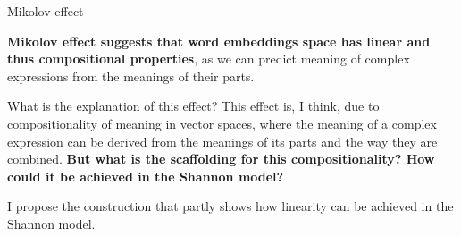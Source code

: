 \documentclass[10pt, aspectratio=169]{beamer}
\begin{document}
\begin{frame}{Mikolov effect}

   
       
   \textbf{ Mikolov effect suggests that word embeddings space has linear and thus compositional properties}, as we can predict meaning of complex expressions from the meanings of their parts.
  

    What is the explanation of this effect?
    This effect is, I think,  due to  compositionality of meaning in vector spaces, where the meaning of a complex expression can be derived from the meanings of its parts and the way they are combined.
\textbf{
    But what is the scaffolding for this compositionality? How could it be achieved in the Shannon model? }
    
    I propose the construction that partly shows how linearity can be achieved in the Shannon model.

\end{frame}
\end{document}
